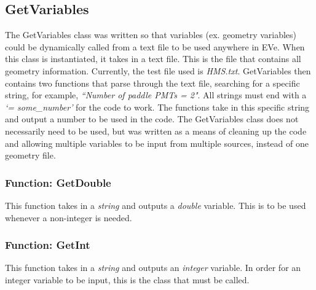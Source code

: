 \documentclass[12pt]{article}
\numberwithin{equation}{section}
\begin{document}
\subsection{GetVariables}
The GetVariables class was written so that variables (ex. geometry variables) could be dynamically called from a text file to be used anywhere in EVe. When this class is instantiated, it takes in a text file. This is the file that contains all geometry information. Currently, the test file used is \textit{HMS.txt}. GetVariables then contains two functions that parse through the text file, searching for a specific string, for example, \textit{``Number of paddle PMTs = 2"}. All strings must end with a \textit{`= some\_number'} for the code to work. The functions take in this specific string and output a number to be used in the code. The GetVariables class does not necessarily need to be used, but was written as a means of cleaning up the code and allowing multiple variables to be input from multiple sources, instead of one geometry file.

\subsubsection{Function: GetDouble}
This function takes in a \textit{string} and outputs a \textit{double} variable. This is to be used whenever a non-integer is needed.

\subsubsection{Function: GetInt}
This function takes in a \textit{string} and outputs an \textit{integer} variable. In order for an integer variable to be input, this is the class that must be called. 
\end{document}

